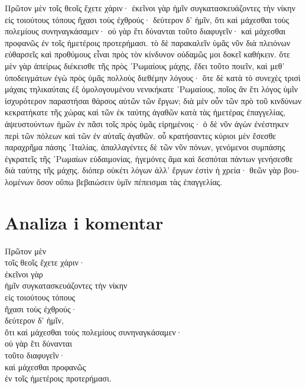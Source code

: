 \medskip

{\large
\begin{greek}
\noindent Πρῶτον μὲν τοῖς θεοῖς ἔχετε χάριν· ἐκεῖνοι γὰρ ἡμῖν συγκατασκευάζοντες τὴν νίκην εἰς τοιούτους τόπους ἤχασι τοὺς ἐχθρούς· δεύτερον δ' ἡμῖν, ὅτι καὶ μάχεσθαι τοὺς πολεμίους συνηναγκάσαμεν· οὐ γὰρ ἔτι δύνανται τοῦτο διαφυγεῖν· καὶ μάχεσθαι προφανῶς ἐν τοῖς ἡμετέροις προτερήμασι. τὸ δὲ παρακαλεῖν ὑμᾶς νῦν διὰ πλειόνων εὐθαρσεῖς καὶ προθύμους εἶναι πρὸς τὸν κίνδυνον οὐδαμῶς μοι δοκεῖ καθήκειν. ὅτε μὲν γὰρ ἀπείρως διέκεισθε τῆς πρὸς ῾Ρωμαίους μάχης, ἔδει τοῦτο ποιεῖν, καὶ μεθ' ὑποδειγμάτων ἐγὼ πρὸς ὑμᾶς πολλοὺς διεθέμην λόγους· ὅτε δὲ κατὰ τὸ συνεχὲς τρισὶ μάχαις τηλικαύταις ἐξ ὁμολογουμένου νενικήκατε ῾Ρωμαίους, ποῖος ἂν ἔτι λόγος ὑμῖν ἰσχυρότερον παραστήσαι θάρσος αὐτῶν τῶν ἔργων; διὰ μὲν οὖν τῶν πρὸ τοῦ κινδύνων κεκρατήκατε τῆς χώρας καὶ τῶν ἐκ ταύτης ἀγαθῶν κατὰ τὰς ἡμετέρας ἐπαγγελίας, ἀψευστούντων ἡμῶν ἐν πᾶσι τοῖς πρὸς ὑμᾶς εἰρημένοις· ὁ δὲ νῦν ἀγὼν ἐνέστηκεν περὶ τῶν πόλεων καὶ τῶν ἐν αὐταῖς ἀγαθῶν. οὗ κρατήσαντες κύριοι μὲν ἔσεσθε παραχρῆμα πάσης ᾿Ιταλίας, ἀπαλλαγέντες δὲ τῶν νῦν πόνων, γενόμενοι συμπάσης ἐγκρατεῖς τῆς ῾Ρωμαίων εὐδαιμονίας, ἡγεμόνες ἅμα καὶ δεσπόται πάντων γενήσεσθε διὰ ταύτης τῆς μάχης. διόπερ οὐκέτι λόγων ἀλλ' ἔργων ἐστὶν ἡ χρεία· θεῶν γὰρ βουλομένων ὅσον οὔπω βεβαιώσειν ὑμῖν πέπεισμαι τὰς ἐπαγγελίας.

\end{greek}
}

\newpage

\section*{Analiza i komentar}


{\large
\begin{greek}
\noindent Πρῶτον μὲν \\
\tabto{2em} τοῖς θεοῖς ἔχετε χάριν·\\
\tabto{4em} ἐκεῖνοι γὰρ \\
\tabto{6em} ἡμῖν συγκατασκευάζοντες τὴν νίκην \\
\tabto{4em} εἰς τοιούτους τόπους \\
\tabto{4em} ἤχασι τοὺς ἐχθρούς·\\
δεύτερον δ' ἡμῖν, \\
\tabto{2em} ὅτι καὶ μάχεσθαι τοὺς πολεμίους συνηναγκάσαμεν·\\
\tabto{4em} οὐ γὰρ ἔτι δύνανται \\
\tabto{6em} τοῦτο διαφυγεῖν·\\
\tabto{6em} καὶ μάχεσθαι προφανῶς \\
\tabto{8em} ἐν τοῖς ἡμετέροις προτερήμασι.\\

\end{greek}
}

